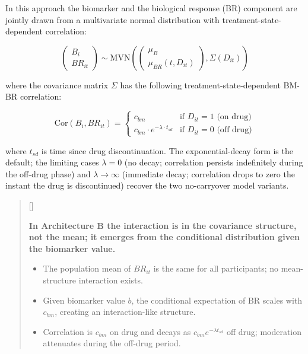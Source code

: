 \documentclass[
  11pt,
]{article}
\newcounter{pgraph}
\newenvironment{bullets}{%
  \stepcounter{pgraph}%
  \begin{quote}\small\sffamily\color[gray]{0.30}%
  {\normalfont\scriptsize\color[gray]{0.58}[\thepgraph]\enspace}}{%
  \end{quote}}
\begin{document}
In this approach the biomarker and the biological response (BR)
component are jointly drawn from a multivariate normal distribution with
treatment-state-dependent correlation:

\[\begin{pmatrix} B_i \\ BR_{it} \end{pmatrix} \sim
\text{MVN}\left(\begin{pmatrix} \mu_B \\ \mu_{BR}(t, D_{it})
\end{pmatrix}, \Sigma(D_{it})\right)\]

where the covariance matrix \(\Sigma\) has the following
treatment-state-dependent BM-BR correlation:

\[\text{Cor}(B_i, BR_{it}) = \begin{cases}
c_{bm} & \text{if } D_{it} = 1 \text{ (on drug)} \\
c_{bm} \cdot e^{-\lambda \cdot t_{sd}} &
\text{if } D_{it} = 0 \text{ (off drug)}
\end{cases}\]

where \(t_{sd}\) is time since drug discontinuation. The
exponential-decay form is the default; the limiting cases
\(\lambda = 0\) (no decay; correlation persists indefinitely during the
off-drug phase) and \(\lambda \to \infty\) (immediate decay; correlation
drops to zero the instant the drug is discontinued) recover the two
no-carryover model variants.

\begin{bullets}

\textbf{In Architecture B the interaction is in the covariance
structure, not the mean; it emerges from the conditional
distribution given the biomarker value.}

\begin{itemize}\setlength{\itemsep}{2pt}\setlength{\parskip}{0pt}
\item The population mean of $BR_{it}$ is the same for all
  participants; no mean-structure interaction exists.
\item Given biomarker value $b$, the conditional expectation
  of BR scales with $c_{bm}$, creating an interaction-like
  structure.
\item Correlation is $c_{bm}$ on drug and decays as
  $c_{bm} e^{-\lambda t_{sd}}$ off drug; moderation attenuates
  during the off-drug period.
\end{itemize}

\end{bullets}
\end{document}
